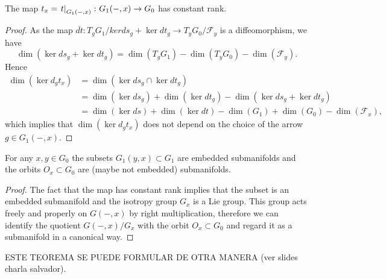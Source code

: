 \begin{prop}
The map $t_x = \left.t\right|_{G_1(-,x)}\colon G_1(-,x)\to G_0$ has constant rank.
\end{prop}

\begin{proof}
As the map $\overline{dt}\colon T_gG_1 / ker ds_g + \ker dt_g \to T_yG_0 / \mathcal{F}_y$ is a diffeomorphism, we have
\begin{equation}
\dim(\ker ds_g + \ker dt_g) = \dim(T_gG_1) - \dim(T_yG_0) - \dim(\mathcal{F}_y) \text{.}
\end{equation}
Hence
\begin{align}
\dim(\ker d_gt_x) &= \dim(\ker ds_g \cap \ker dt_g) \\
 &= \dim(\ker ds_g) + \dim(\ker dt_g) - \dim(\ker ds_g + \ker dt_g) \\
 &= \dim(\ker ds) + \dim(\ker dt) - \dim(G_1) + \dim(G_0) - \dim(\mathcal{F}_x) \text{,}
\end{align}
which implies that $\dim(\ker d_gt_x)$ does not depend on the choice of the arrow $g\in G_1(-,x)$.
\end{proof}

\begin{thm}
For any $x,y \in G_0$ the subsets $G_1(y,x) \subset G_1$ are embedded submanifolds and the orbits $O_x \subset G_0$ are (maybe not embedded) submanifolds.
\end{thm}

\begin{proof}
The fact that the map  has constant rank implies that the subset  is an embedded submanifold and the isotropy group $G_x$ is a Lie group.
This group acts freely and properly on $G(-,x)$ by right multiplication, therefore we can identify the quotient $G(-,x)/G_x$ with the orbit $O_x\subset G_0$ and regard it as a submanifold in a canonical way.
\end{proof}

\noi ESTE TEOREMA SE PUEDE FORMULAR DE OTRA MANERA (ver slides charla salvador).